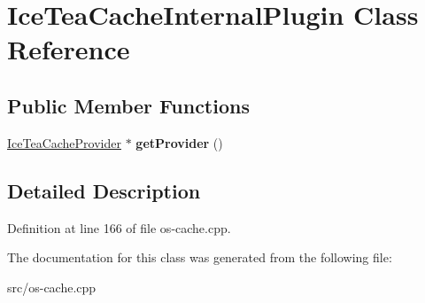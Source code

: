 \hypertarget{class_ice_tea_cache_internal_plugin}{}\section{Ice\+Tea\+Cache\+Internal\+Plugin Class Reference}
\label{class_ice_tea_cache_internal_plugin}
\subsection*{Public Member Functions}
\begin{DoxyCompactItemize}
\item 
\hyperlink{class_ice_tea_cache_provider}{Ice\+Tea\+Cache\+Provider} $\ast$ {\bfseries get\+Provider} ()\hypertarget{class_ice_tea_cache_internal_plugin_a73f59bceb8d53bc261c04e41bb261113}{}\label{class_ice_tea_cache_internal_plugin_a73f59bceb8d53bc261c04e41bb261113}

\end{DoxyCompactItemize}


\subsection{Detailed Description}


Definition at line 166 of file os-\/cache.\+cpp.



The documentation for this class was generated from the following file\+:\begin{DoxyCompactItemize}
\item 
src/os-\/cache.\+cpp\end{DoxyCompactItemize}
